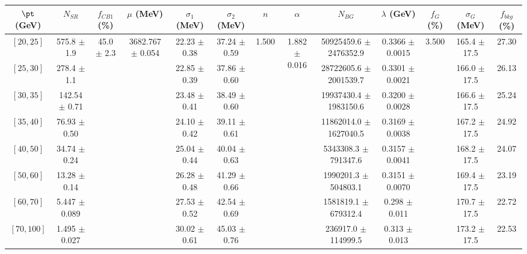 \begin{tabular}{c||c|c|c|c|c|c|c|c|c|c|c||c}
$\pt$ (GeV) & $N_{SR}$ & $f_{CB1}$ (\%) & $\mu$ (MeV) & $\sigma_1$ (MeV) & $\sigma_2$ (MeV) & $n$ & $\alpha$ & $N_{BG}$ & $\lambda$ (GeV) & $f_G$ (\%) & $\sigma_G$ (MeV) & $f_{bkg}$ (\%) \\
\hline
$[20, 25]$ & 575.8 $\pm$ 1.9 & \multirow{8}{*}{45.0 $\pm$ 2.3} & \multirow{8}{*}{3682.767 $\pm$ 0.054} & 22.23 $\pm$ 0.38 & 37.24 $\pm$ 0.59 & \multirow{8}{*}{1.500} & \multirow{8}{*}{1.882 $\pm$ 0.016} & 50925459.6 $\pm$ 2476352.9 & 0.3366 $\pm$ 0.0015 & \multirow{8}{*}{3.500} & 165.4 $\pm$ 17.5 & 27.30\\
$[25, 30]$ & 278.4 $\pm$ 1.1 &  &  & 22.85 $\pm$ 0.39 & 37.86 $\pm$ 0.60 &  &  & 28722605.6 $\pm$ 2001539.7 & 0.3301 $\pm$ 0.0021 &  & 166.0 $\pm$ 17.5 & 26.13\\
$[30, 35]$ & 142.54 $\pm$ 0.71 &  &  & 23.48 $\pm$ 0.41 & 38.49 $\pm$ 0.60 &  &  & 19937430.4 $\pm$ 1983150.6 & 0.3200 $\pm$ 0.0028 &  & 166.6 $\pm$ 17.5 & 25.24\\
$[35, 40]$ & 76.93 $\pm$ 0.50 &  &  & 24.10 $\pm$ 0.42 & 39.11 $\pm$ 0.61 &  &  & 11862014.0 $\pm$ 1627040.5 & 0.3169 $\pm$ 0.0038 &  & 167.2 $\pm$ 17.5 & 24.92\\
$[40, 50]$ & 34.74 $\pm$ 0.24 &  &  & 25.04 $\pm$ 0.44 & 40.04 $\pm$ 0.63 &  &  & 5343308.3 $\pm$ 791347.6 & 0.3157 $\pm$ 0.0041 &  & 168.2 $\pm$ 17.5 & 24.07\\
$[50, 60]$ & 13.28 $\pm$ 0.14 &  &  & 26.28 $\pm$ 0.48 & 41.29 $\pm$ 0.66 &  &  & 1990201.3 $\pm$ 504803.1 & 0.3151 $\pm$ 0.0070 &  & 169.4 $\pm$ 17.5 & 23.19\\
$[60, 70]$ & 5.447 $\pm$ 0.089 &  &  & 27.53 $\pm$ 0.52 & 42.54 $\pm$ 0.69 &  &  & 1581819.1 $\pm$ 679312.4 & 0.298 $\pm$ 0.011 &  & 170.7 $\pm$ 17.5 & 22.72\\
$[70, 100]$ & 1.495 $\pm$ 0.027 &  &  & 30.02 $\pm$ 0.61 & 45.03 $\pm$ 0.76 &  &  & 236917.0 $\pm$ 114999.5 & 0.313 $\pm$ 0.013 &  & 173.2 $\pm$ 17.5 & 22.53\\
\end{tabular}
